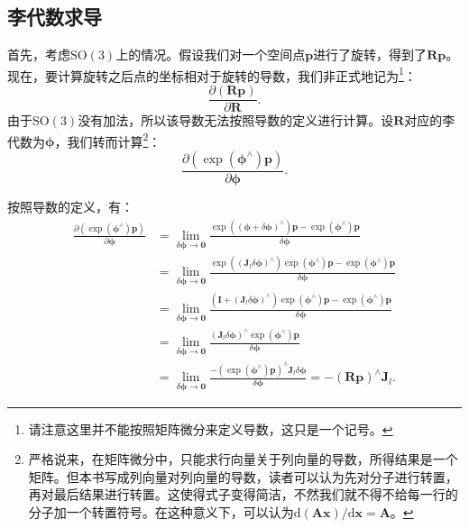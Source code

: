 \subsection{李代数求导}
首先，考虑$\mathrm{SO}(3)$上的情况。假设我们对一个空间点$\bm{p}$进行了旋转，得到了$\bm{R} \bm{p}$。现在，要计算旋转之后点的坐标相对于旋转的导数，我们非正式地记为\footnote{请注意这里并不能按照矩阵微分来定义导数，这只是一个记号。}：
\[
\frac{{\partial \left( {\bm{Rp}} \right)}}{{\partial \bm{R}}}.
\]
由于$\mathrm{SO}(3)$没有加法，所以该导数无法按照导数的定义进行计算。设$\bm{R}$对应的李代数为$\boldsymbol{\phi}$，我们转而计算\footnote{严格说来，在矩阵微分中，只能求行向量关于列向量的导数，所得结果是一个矩阵。但本书写成列向量对列向量的导数，读者可以认为先对分子进行转置，再对最后结果进行转置。这使得式子变得简洁，不然我们就不得不给每一行的分子加一个转置符号。在这种意义下，可以认为$\mathrm{d}(\bm{Ax})/\mathrm{d}\bm{x} = \bm{A}$。}：
\[ \frac{{\partial \left( {\exp \left( \boldsymbol{\phi} ^ \wedge \right) \bm{p}} \right)}}{{\partial \boldsymbol{\phi} }}. \]

按照导数的定义，有：
\begin{align*}
\frac{{\partial \left( {\exp \left( {{ \boldsymbol{\phi} ^ \wedge }} \right) \bm{p}} \right)}}{{\partial \boldsymbol{\phi} }} &= \mathop {\lim }\limits_{\delta \boldsymbol{\phi}  \to \bm{0}} \frac{{\exp \left( {{{\left( {\boldsymbol{\phi}  + \delta \boldsymbol{\phi} } \right)}^ \wedge }} \right) \bm{p} - \exp \left( {{\boldsymbol{\phi} ^ \wedge }} \right)\bm{p}}}{{\delta \boldsymbol{\phi} }}\\
& = \mathop {\lim }\limits_{\delta \boldsymbol{\phi}  \to \bm{0}} \frac{{\exp \left( {{{\left( {{\bm{J}_l}\delta \boldsymbol{\phi} } \right)}^ \wedge }} \right)\exp \left( {{\boldsymbol{\phi} ^ \wedge }} \right) \bm{p} - \exp \left( {{\boldsymbol{\phi} ^ \wedge }} \right) \bm{p}}}{{\delta \boldsymbol{\phi} }}\\
&= \mathop {\lim }\limits_{\delta \boldsymbol{\phi}  \to \bm{0}} \frac{{\left( { \bm{I} + {{\left( {{ \bm{J}_l}\delta \boldsymbol{\phi} } \right)}^ \wedge }} \right)\exp \left( {{\boldsymbol{\phi} ^ \wedge }} \right) \bm{p} - \exp \left( {{\boldsymbol{\phi} ^ \wedge }} \right)\bm{p}}}{{\delta \boldsymbol{\phi} }}\\
&= \mathop {\lim }\limits_{\delta \boldsymbol{\phi}  \to \bm{0}} \frac{{{{\left( {{\bm{J}_l}\delta \boldsymbol{\phi} } \right)}^ \wedge }\exp \left( {{\boldsymbol{\phi} ^ \wedge }} \right)\bm{p}}}{{\delta \boldsymbol{\phi} }}\\
&= \mathop {\lim }\limits_{\delta \boldsymbol{\phi}  \to \bm{0}} \frac{{ - {{\left( {\exp \left( {{\boldsymbol{\phi} ^ \wedge }} \right)\bm{p}} \right)}^ \wedge }{\bm{J}_l}\delta \boldsymbol{\phi} }}{{\delta \boldsymbol{\phi}}} =  - {\left( {\bm{Rp}} \right)^ \wedge }{\bm{J}_l}.
\end{align*}

